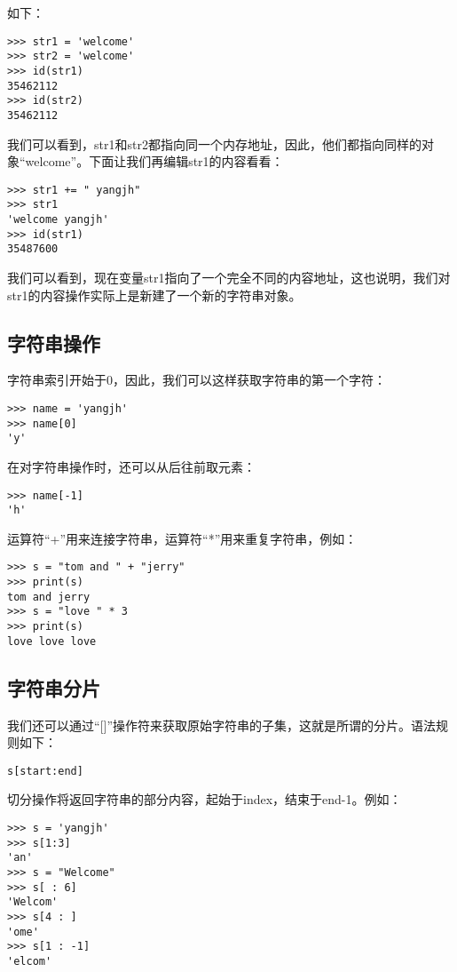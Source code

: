 如下：

\begin{lstlisting}
>>> str1 = 'welcome'
>>> str2 = 'welcome'
>>> id(str1)
35462112
>>> id(str2)
35462112
\end{lstlisting}

我们可以看到，str1和str2都指向同一个内存地址，因此，他们都指向同样的对象“welcome”。下面让我们再编辑str1的内容看看：

\begin{lstlisting}
>>> str1 += " yangjh"
>>> str1
'welcome yangjh'
>>> id(str1)
35487600
\end{lstlisting}

我们可以看到，现在变量str1指向了一个完全不同的内容地址，这也说明，我们对str1的内容操作实际上是新建了一个新的字符串对象。

\subsection{字符串操作}

字符串索引开始于0，因此，我们可以这样获取字符串的第一个字符：

\begin{lstlisting}
>>> name = 'yangjh'
>>> name[0]
'y'
\end{lstlisting}

在对字符串操作时，还可以从后往前取元素：

\begin{lstlisting}
>>> name[-1]
'h'
\end{lstlisting}

运算符“+”用来连接字符串，运算符“*”用来重复字符串，例如：

\begin{lstlisting}
>>> s = "tom and " + "jerry"
>>> print(s)
tom and jerry
>>> s = "love " * 3
>>> print(s)
love love love
\end{lstlisting}

\subsection{字符串分片}
我们还可以通过“[]”操作符来获取原始字符串的子集，这就是所谓的分片。语法规则如下：

\begin{lstlisting}
s[start:end]
\end{lstlisting}

切分操作将返回字符串的部分内容，起始于index，结束于end-1。例如：

\begin{lstlisting}
>>> s = 'yangjh'
>>> s[1:3]
'an'
>>> s = "Welcome"
>>> s[ : 6]
'Welcom'
>>> s[4 : ]
'ome'
>>> s[1 : -1]
'elcom'
\end{lstlisting}

